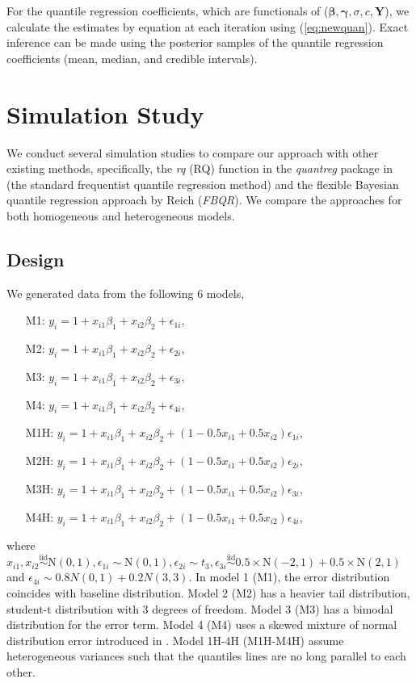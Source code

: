 \documentclass[12pt]{article}
\begin{document}
For the quantile regression coefficients, which are functionals of
($\bm \beta, \bm \gamma, \sigma, c, \bm Y$), we calculate the
estimates by equation at each iteration using
(\ref{eq:newquan}). Exact inference can be made using the posterior
samples of the quantile regression coefficients (mean, median, and
credible intervals).

\section{Simulation Study}
\label{sec:simulations}
We conduct several simulation studies to compare our approach with
other existing methods, specifically, the \textit{rq} (RQ) function in the
\textit{quantreg} package \citep{quantreg} in \cite{R} (the standard
frequentist quantile regression method) and the flexible Bayesian
quantile regression approach by Reich (\textit{FBQR}).  We compare the
approaches for both homogeneous and heterogeneous models.

\subsection{Design}
We generated data from the following 6 models,
\begin{itemize}
\item [M1:] $y_i = 1 + x_{i1}\beta_1 + x_{i2}\beta_2 + \epsilon_{1i}$,
\item [M2:] $y_i = 1 + x_{i1}\beta_1 + x_{i2}\beta_2 + \epsilon_{2i}$,
\item [M3:] $y_i = 1 + x_{i1}\beta_1 + x_{i2}\beta_2 + \epsilon_{3i}$,
\item [M4:] $y_i = 1 + x_{i1}\beta_1 + x_{i2}\beta_2 + \epsilon_{4i}$,
\item [M1H:] $y_i = 1 + x_{i1}\beta_1 + x_{i2}\beta_2 + (1 -
  0.5x_{i1}+0.5x_{i2}) \epsilon_{1i}$,
\item [M2H:] $y_i = 1 + x_{i1}\beta_1 + x_{i2}\beta_2 + (1 -
  0.5x_{i1}+0.5x_{i2}) \epsilon_{2i}$,
\item [M3H:] $y_i = 1 + x_{i1}\beta_1 + x_{i2}\beta_2 + (1 -
  0.5x_{i1}+0.5x_{i2}) \epsilon_{3i}$,
\item [M4H:] $y_i = 1 + x_{i1}\beta_1 + x_{i2}\beta_2 + (1 -
  0.5x_{i1}+0.5x_{i2}) \epsilon_{4i}$,
\end{itemize}
where $x_{i1}, x_{i2} \stackrel{\text{iid}}{\sim} \mathrm{N}(0,1),
\epsilon_{1i} \sim \mathrm{N}(0,1), \epsilon_{2i} \sim t_3,
\epsilon_{3i} \stackrel{\text{iid}}{\sim} 0.5 \times \mathrm{N}(-2,1)
+ 0.5 \times \mathrm{N}(2,1)$ and $\epsilon_{4i} \sim 0.8 N(0,1) + 0.2
N(3,3)$. In model 1 (M1), the error distribution coincides with
baseline distribution. Model 2 (M2) has a heavier tail distribution,
student-t distribution with 3 degrees of freedom. Model 3 (M3) has a
bimodal distribution for the error term.  Model 4 (M4) uses a skewed
mixture of normal distribution error introduced in
\citet{reich2010}. Model 1H-4H (M1H-M4H) assume heterogeneous
variances such that the quantiles lines are no long parallel to each
other.
\end{document}
